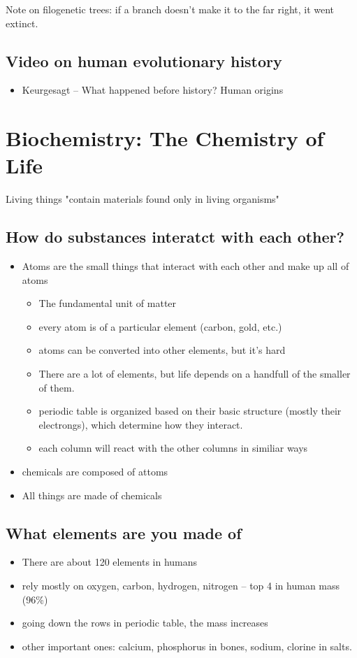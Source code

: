 \documentclass{article}
\theoremstyle{definition}
\begin{document}
Note on filogenetic trees: if a branch doesn't make it to the far right, it went extinct.

\subsection{Video on human evolutionary history}
\begin{itemize}
	\item Keurgesagt -- What happened before history? Human origins
\end{itemize}

\section{Biochemistry: The Chemistry of Life}
Living things "contain materials found only in living organisms"

\subsection{How do substances interatct with each other?}
\begin{itemize}
	\item Atoms are the small things that interact with each other and make up all of atoms
		\begin{itemize}
			\item The fundamental unit of matter
			\item every atom is of a particular element (carbon, gold, etc.)
			\item atoms can be converted into other elements, but it's hard
			\item There are a lot of elements, but life depends on a handfull of the smaller of them.
			\item periodic table is organized based on their basic structure (mostly their electrongs), which determine how they interact.
			\item each column will react with the other columns in similiar ways
		\end{itemize}
	\item chemicals are composed of attoms
	\item All things are made of chemicals
\end{itemize}

\subsection{What elements are you made of}
\begin{itemize}
	\item There are about 120 elements in humans
	\item rely mostly on oxygen, carbon, hydrogen, nitrogen -- top 4 in human mass (96\%)
	\item going down the rows in periodic table, the mass increases
	\item other important ones: calcium, phosphorus in bones, sodium, clorine in salts.
\end{itemize}
\end{document}
